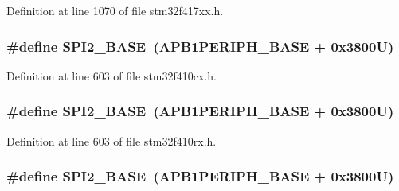 Definition at line 1070 of file stm32f417xx.\+h.

\subsubsection[{\texorpdfstring{S\+P\+I2\+\_\+\+B\+A\+SE}{SPI2_BASE}}]{\setlength{\rightskip}{0pt plus 5cm}\#define S\+P\+I2\+\_\+\+B\+A\+SE~({\bf A\+P\+B1\+P\+E\+R\+I\+P\+H\+\_\+\+B\+A\+SE} + 0x3800\+U)}\hypertarget{group___peripheral__registers__structures_gac3e357b4c25106ed375fb1affab6bb86}{}\label{group___peripheral__registers__structures_gac3e357b4c25106ed375fb1affab6bb86}


Definition at line 603 of file stm32f410cx.\+h.

\subsubsection[{\texorpdfstring{S\+P\+I2\+\_\+\+B\+A\+SE}{SPI2_BASE}}]{\setlength{\rightskip}{0pt plus 5cm}\#define S\+P\+I2\+\_\+\+B\+A\+SE~({\bf A\+P\+B1\+P\+E\+R\+I\+P\+H\+\_\+\+B\+A\+SE} + 0x3800\+U)}\hypertarget{group___peripheral__registers__structures_gac3e357b4c25106ed375fb1affab6bb86}{}\label{group___peripheral__registers__structures_gac3e357b4c25106ed375fb1affab6bb86}


Definition at line 603 of file stm32f410rx.\+h.

\subsubsection[{\texorpdfstring{S\+P\+I2\+\_\+\+B\+A\+SE}{SPI2_BASE}}]{\setlength{\rightskip}{0pt plus 5cm}\#define S\+P\+I2\+\_\+\+B\+A\+SE~({\bf A\+P\+B1\+P\+E\+R\+I\+P\+H\+\_\+\+B\+A\+SE} + 0x3800\+U)}\hypertarget{group___peripheral__registers__structures_gac3e357b4c25106ed375fb1affab6bb86}{}\label{group___peripheral__registers__structures_gac3e357b4c25106ed375fb1affab6bb86}



